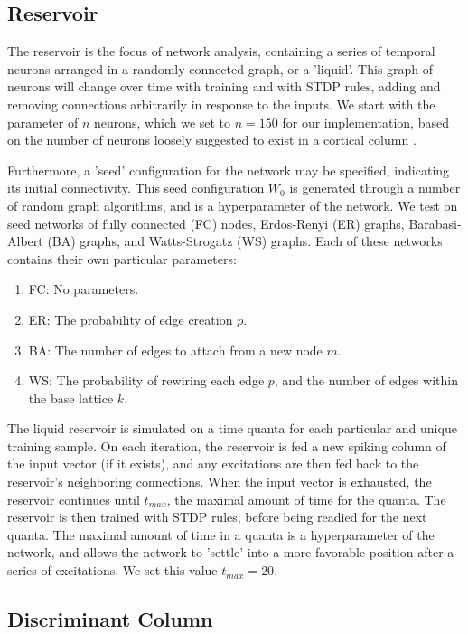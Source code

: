 \subsection{Reservoir}

The reservoir is the focus of network analysis, containing a series of temporal
neurons arranged in a randomly connected graph, or a 'liquid'. This graph of
neurons will change over time with training and with STDP rules, adding and
removing connections arbitrarily in response to the inputs. We start with the
parameter of $n$ neurons, which we set to $n=150$ for our implementation, based
on the number of neurons loosely suggested to exist in a cortical column
\cite{Mountcastle}.

Furthermore, a 'seed' configuration for the network may be specified, indicating
its initial connectivity. This seed configuration $W_0$ is generated through a
number of random graph algorithms, and is a hyperparameter of the network. We
test on seed networks of fully connected (FC) nodes, Erdos-Renyi (ER) graphs,
Barabasi-Albert (BA) graphs, and Watts-Strogatz (WS) graphs. Each of these
networks contains their own particular parameters:

\begin{enumerate}
    \item FC: No parameters.
    \item ER: The probability of edge creation $p$.
    \item BA: The number of edges to attach from a new node $m$.
    \item WS: The probability of rewiring each edge $p$, and the number of
          edges within the base lattice $k$.
\end{enumerate}

The liquid reservoir is simulated on a time quanta for each particular and
unique training sample. On each iteration, the reservoir is fed a new spiking
column of the input vector (if it exists), and any excitations are then fed back
to the reservoir's neighboring connections. When the input vector is exhausted,
the reservoir continues until $t_{max}$, the maximal amount of time for the
quanta. The reservoir is then trained with STDP rules, before being readied for
the next quanta. The maximal amount of time in a quanta is a hyperparameter of
the network, and allows the network to 'settle' into a more favorable position
after a series of excitations. We set this value $t_{max} = 20$.

\subsection{Discriminant Column}

